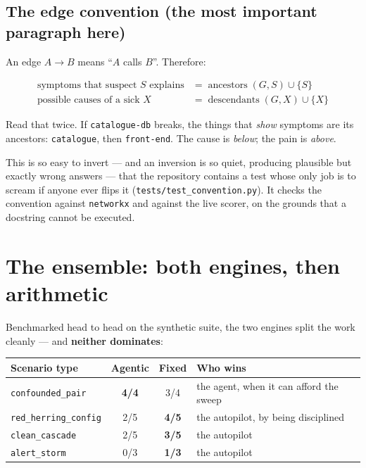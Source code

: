 \documentclass[11pt,a4paper]{article}
\newcommand{\code}[1]{\texttt{\small #1}}
\begin{document}
\subsection{The edge convention (the most important paragraph here)}

An edge $A \rightarrow B$ means ``$A$ calls $B$''. Therefore:

\begin{align}
  \text{symptoms that suspect } S \text{ explains} &= \operatorname{ancestors}(G, S) \cup \{S\} \\
  \text{possible causes of a sick } X &= \operatorname{descendants}(G, X) \cup \{X\}
\end{align}

Read that twice. If \code{catalogue-db} breaks, the things that \emph{show}
symptoms are its ancestors: \code{catalogue}, then \code{front-end}. The cause
is \emph{below}; the pain is \emph{above}.

This is so easy to invert --- and an inversion is so quiet, producing plausible
but exactly wrong answers --- that the repository contains a test whose only job
is to scream if anyone ever flips it (\code{tests/test\_convention.py}). It
checks the convention against \code{networkx} and against the live scorer, on the
grounds that a docstring cannot be executed.

\section{The ensemble: both engines, then arithmetic}
\label{sec:ensemble}

Benchmarked head to head on the synthetic suite, the two engines split the work
cleanly --- and \textbf{neither dominates}:

\begin{center}
\footnotesize
\begin{tabular}{@{}lccl@{}}
\toprule
\textbf{Scenario type} & \textbf{Agentic} & \textbf{Fixed} & \textbf{Who wins} \\
\midrule
\code{confounded\_pair}     & \textbf{4/4} & 3/4 & the agent, when it can afford the sweep \\
\code{red\_herring\_config} & 2/5 & \textbf{4/5} & the autopilot, by being disciplined \\
\code{clean\_cascade}       & 2/5 & \textbf{3/5} & the autopilot \\
\code{alert\_storm}         & 0/3 & \textbf{1/3} & the autopilot \\
\bottomrule
\end{tabular}
\end{center}
\end{document}
